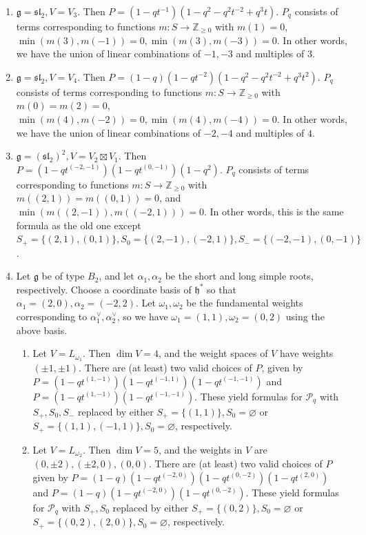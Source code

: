 \documentclass[12pt]{article}
\newcommand{\Z}{\mathbb{Z}}
\renewcommand{\sl}{\mathfrak{sl}}
\theoremstyle{definition}
\theoremstyle{remark}
\newcommand{\g}{\mathfrak{g}}
\renewcommand{\P}{\mathcal{P}}
\newcommand{\h}{\mathfrak{h}}
\begin{document}
\begin{enumerate}
    \item $\g=\sl_2, V=V_3$. Then $P=(1-qt^{-1})(1-q^2-q^2t^{-2}+q^3t)$. $P_q$ consists of terms corresponding to functions $m:S\to\Z_{\geq 0}$ with $m(1)=0$, $\min(m(3),m(-1))=0, \min(m(3),m(-3))=0$. In other words, we have the union of linear combinations of $-1,-3$ and multiples of $3$.
    \item $\g=\sl_2, V=V_4$. Then $P=(1-q)(1-qt^{-2})(1-q^2-q^2t^{-2}+q^3t^2)$. $P_q$ consists of terms corresponding to functions $m:S\to\Z_{\geq 0}$ with $m(0)=m(2)=0$, $\min(m(4),m(-2))=0, \min(m(4),m(-4))=0$. In other words, we have the union of linear combinations of $-2,-4$ and multiples of $4$.
    \item $\g=(\sl_2)^2,V=V_2\boxtimes V_1$. Then $P=(1-qt^{(-2,-1)})(1-qt^{(0,-1)})(1-q^2)$. $P_q$ consists of terms corresponding to functions $m:S\to\Z_{\geq 0}$ with $m((2,1))=m((0,1))=0$, and $\min(m((2,-1)),m((-2,1)))=0$. In other words, this is the same formula as the old one except $S_+=\{(2,1),(0,1)\},S_0=\{(2,-1),(-2,1)\},S_-=\{(-2,-1),(0,-1)\}$.
    \item Let $\g$ be of type $B_2$, and let $\alpha_1,\alpha_2$ be the short and long simple roots, respectively. Choose a coordinate basis of $\h^*$ so that $\alpha_1=(2,0), \alpha_2=(-2,2)$. Let $\omega_1,\omega_2$ be the fundamental weights corresponding to $\alpha_1^\vee, \alpha_2^\vee$, so we have $\omega_1=(1,1), \omega_2=(0,2)$ using the above basis.
    \begin{enumerate}
        \item Let $V=L_{\omega_1}$. Then $\dim V=4$, and the weight spaces of $V$ have weights $(\pm 1,\pm 1)$. There are (at least) two valid choices of $P$, given by $P=(1-qt^{(1,-1)})(1-qt^{(-1,1)})(1-qt^{(-1,-1)})$ and $P=(1-qt^{(1,-1)})(1-qt^{(-1,-1)})$. These yield formulas for $\P_q$ with $S_+,S_0,S_-$ replaced by either $S_+=\{(1,1)\}, S_0=\varnothing$ or $S_+=\{(1,1),(-1,1)\},S_0=\varnothing$, respectively.
        \item Let $V=L_{\omega_2}$. Then $\dim V=5$, and the weights in $V$ are $(0,\pm 2), (\pm 2,0),(0,0)$. There are (at least) two valid choices of $P$ given by $P=(1-q)(1-qt^{(-2,0)})(1-qt^{(0,-2)})(1-qt^{(2,0)})$ and $P=(1-q)(1-qt^{(-2,0)})(1-qt^{(0,-2)})$. These yield formulas for $\P_q$ with $S_+,S_0$ replaced by either $S_+=\{(0,2)\},S_0=\varnothing$ or $S_+=\{(0,2),(2,0)\},S_0=\varnothing$, respectively.
    \end{enumerate}
\end{enumerate}
\end{document}
